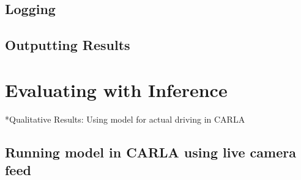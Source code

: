 \documentclass{article} %
\begin{document}
\subsection{Logging}

\subsection{Outputting Results}



\section{Evaluating with Inference}

*Qualitative Results: Using model for actual driving in CARLA

\subsection{Running model in CARLA using live camera feed}
\end{document}
